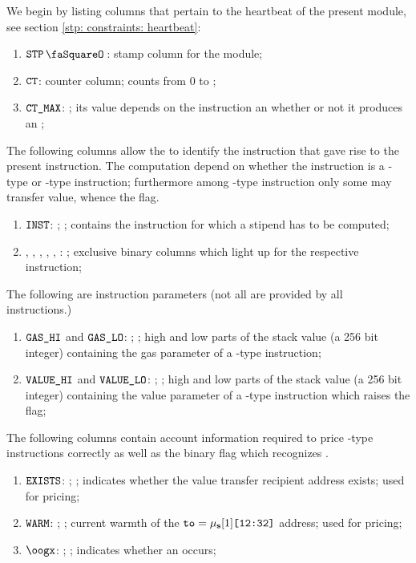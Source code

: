 We begin by listing columns that pertain to the heartbeat of the present module, see section \ref{stp: constraints: heartbeat}:
\begin{enumerate}
	\item $\stpStamp{}$:
		stamp column for the \stpMod{} module;
	\item $\texttt{CT}{}$:
		counter column; counts from 0 to \maxCt{};
	\item $\texttt{CT\_MAX}{}$:
		\ccc{}; its value depends on the instruction an whether or not it produces an \oogxSH{};
\end{enumerate}
The following columns allow the \stpMod{} to identify the instruction that gave rise to the present instruction. The computation depend on whether the instruction is a -type or -type instruction; furthermore among -type instruction only some may transfer value, whence the \cctv{} flag.
\begin{enumerate}[resume]
	\item $\texttt{INST}$: \godGiven{};
		\ccc{}; contains the instruction for which a stipend has to be computed;
	\item \stpCreate, \stpCreateTwo, \stpCall, \stpCallCode, \stpDelegateCall, \stpStaticCall:
		\ccbc{}; exclusive binary columns which light up for the respective instruction;
\end{enumerate}
The following are instruction parameters (not all are provided by all instructions.)
\begin{enumerate}[resume]
	\item $\texttt{GAS\_HI}$ and $\texttt{GAS\_LO}$: \godGiven{};
		\ccc{}; high and low parts of the stack value (a 256 bit integer) containing the gas parameter of a -type instruction;
	\item $\texttt{VALUE\_HI}$ and $\texttt{VALUE\_LO}$: \godGiven{};
		\ccc{}; high and low parts of the stack value (a 256 bit integer) containing the value parameter of a -type instruction which raises the \cctv{} flag;
\end{enumerate}
The following columns contain account information required to price -type instructions correctly as well as the binary flag which recognizes \oogxSH{}.
\begin{enumerate}[resume]
	\item $\texttt{EXISTS}$: \godGiven{};
		\ccbc{}; indicates whether the value transfer recipient address exists; used for  pricing;
	\item $\texttt{WARM}$: \godGiven{};
		\ccbc{}; current warmth of the $\texttt{to} = \mu_\textbf{s}[1]\texttt{[12:32]}$ address; used for  pricing;
	\item $\oogx$: \godGiven{};
		\ccbc{}; indicates whether an \oogxSH{} occurs;
\end{enumerate}
